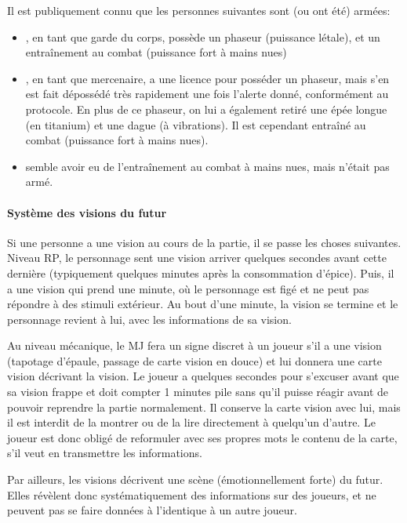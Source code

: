 {	%
	\par Il est publiquement connu que les personnes suivantes sont (ou ont été) armées:
	\begin{itemize}
		\item \nmPlayerVIII, en tant que garde du corps, possède un phaseur (puissance létale), et un entraînement au combat (puissance fort à mains nues)
		\item \nmPlayerX, en tant que mercenaire, a une licence pour posséder un phaseur, mais s'en est fait dépossédé très rapidement une fois l'alerte donné, conformément au protocole. En plus de ce phaseur, on lui a également retiré une épée longue (en titanium) et une dague (à vibrations). Il est cependant entraîné au combat (puissance fort à mains nues).
		\item \nmPlayerXI semble avoir eu de l'entraînement au combat à mains nues, mais n'était pas armé.
	\end{itemize}
	
	
	\paragraph{Système des visions du futur} Si une personne a une vision au cours de la partie, il se passe les choses suivantes. Niveau RP, le personnage sent une vision arriver quelques secondes avant cette dernière (typiquement quelques minutes après la consommation d'épice). Puis, il a une vision qui prend une minute, où le personnage est figé et ne peut pas répondre à des stimuli extérieur. Au bout d'une minute, la vision se termine et le personnage revient à lui, avec les informations de sa vision.
	
	\par Au niveau mécanique, le MJ fera un signe discret à un joueur s'il a une vision (tapotage d'épaule, passage de carte vision en douce) et lui donnera une carte vision décrivant la vision. Le joueur a quelques secondes pour s'excuser avant que sa vision frappe et doit compter 1 minutes pile sans qu'il puisse réagir avant de pouvoir reprendre la partie normalement. Il conserve la carte vision avec lui, mais il est interdit de la montrer ou de la lire directement à quelqu'un d'autre. Le joueur est donc obligé de reformuler avec ses propres mots le contenu de la carte, s'il veut en transmettre les informations.
	
	\par Par ailleurs, les visions décrivent une scène (émotionnellement forte) du futur. Elles révèlent donc systématiquement des informations sur des joueurs, et ne peuvent pas se faire données à l'identique à un autre joueur.
}



